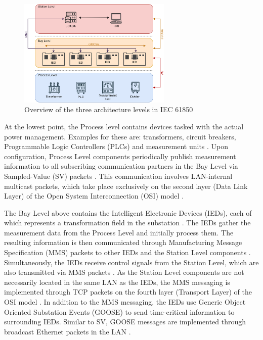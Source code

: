 \documentclass[conference, onecolumn, a4paper]{IEEEtran}
\begin{document}
\begin{figure}[h]
    \centering
    \includegraphics[width=0.65\textwidth]{images/IEC61850_Architecture.png}
    \caption{Overview of the three architecture levels in IEC 61850 \cite{SGRWin_IEC61850Architecture:2021}}
    \label{image:IEC61850Architecture}
\end{figure}

\noindent At the lowest point, the Process level contains devices tasked with the actual power management. Examples for these are: transformers, circuit 
breakers, Programmable Logic Controllers (PLCs) and measurement units \cite{SGRWin_IEC61850Architecture:2021}. Upon configuration, Process Level components 
periodically publish measurement information to all subscribing communication partners in the Bay Level via Sampled-Value (SV) packets 
\cite{TyphoonHIL_IEC61850SV:2021}. This communication involves LAN-internal multicast packets, which take place exclusively on the second layer 
(Data Link Layer) of the Open System Interconnection (OSI) model \cite{TyphoonHIL_IEC61850SV:2021}. 

\smallskip
The Bay Level above contains the Intelligent Electronic Devices (IEDs), each of which represents a transformation field in the substation 
\cite[p. 39]{IEC61850-7-1:2011}. The IEDs gather the measurement data from the Process Level and initially process them. The resulting information 
is then communicated through Manufacturing Message Specification (MMS) packets to other IEDs and the Station Level components \cite[p. 44]{IEC61850-8-1:2011}. 
Simultaneously, the IEDs receive control signals from the Station Level, which are also transmitted via MMS packets \cite{trafficGen_IEC61850:2011}. 
As the Station Level components are not necessarily located in the same LAN as the IEDs, the MMS messaging is implemented through TCP packets on the 
fourth layer (Transport Layer) of the OSI model \cite[p. 45]{IEC61850-8-1:2011}. In addition to the MMS messaging, the IEDs use Generic Object 
Oriented Substation Events (GOOSE) to send time-critical information to surrounding IEDs. Similar to SV, GOOSE messages are implemented through 
broadcast Ethernet packets in the LAN \cite{GOOSE_confidentiality_integrity:2020}.
\end{document}
